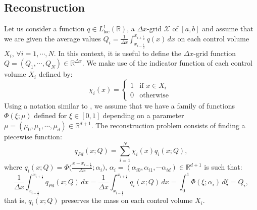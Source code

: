 \subsection{Reconstruction}
\label{chp2-sec-recon}
Let us consider a function ${q} \in L^{1}_{\text{loc}}(\mathbb{R})$, a $\Delta x$-grid 
$\mathcal{X}$ of $[a,b]$ and assume that we are given the average values ${Q}_i = \frac{1}{\Delta x} 
\int_{x_{i-\frac{1}{2}}}^{x_{i+\frac{1}{2}}} {q}(x) \,dx$
on each control volume $X_i$, $\forall i = 1, \cdots, N $. In this context, it is useful to define 
the $\Delta x$-grid function $Q=(Q_1, \cdots, Q_N) \in \mathbb{R}^{\Delta x}$.
We make use of the indicator function of each control volume $X_i$ defined by:
\begin{equation*}
	\label{chp2-sec3-1-eq1}
	\chi_{i}(x)=
	\begin{cases}
		1 & \text{if } x \in X_i\\
		0 & \text{otherwise }
	\end{cases}
\end{equation*}
Using a notation similar to \citet[Chapter~1]{stoer:2002}, 
we assume that we have a family of functions $\Phi(\xi;\mu)$ defined for $\xi \in [0,1]$ depending on
a parameter $\mu =(\mu_0, \mu_1,\cdots, \mu_d)\in \mathbb{R}^{d+1}$. 
The reconstruction problem consists of finding a piecewise function:
\begin{equation}
	\label{chp2-sec3-1-eq2}
	q_{Pd}(x;Q) = \sum_{i=1}^{N} \chi_i(x) q_i(x;Q),
\end{equation}
where $q_i(x;Q) = \Phi\big(\frac{x-x_{i-\frac{1}{2}}}{\Delta x};\alpha_i\big)$, 
$\alpha_i= (\alpha_{i0},\alpha_{i1}, \cdots \alpha_{id})\in\mathbb{R}^{d+1}$ is such that:
\begin{equation*}
	\frac{1}{\Delta x}\int_{x_{i-\frac{1}{2}}}^{x_{i+\frac{1}{2}}} {q}_{Pd}(x;Q) \,dx =
	\frac{1}{\Delta x}\int_{x_{i-\frac{1}{2}}}^{x_{i+\frac{1}{2}}} q_i(x;Q) \,dx =
	\int_{0}^{1} \Phi(\xi;\alpha_i) \,d\xi = {Q}_i,
\end{equation*}
that is, $q_i(x;Q)$ preserves the mass on each control volume $X_i$.

